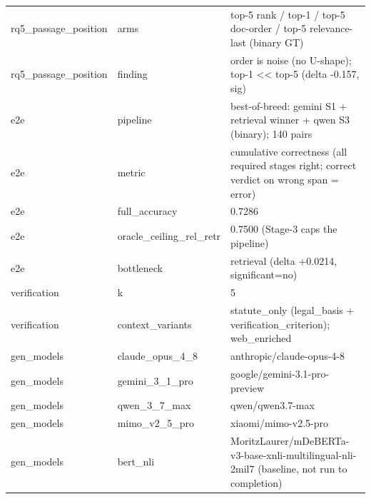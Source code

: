 \begin{table}[htbp]
\begin{tabular}{lll}
    rq5\_passage\_position & arms & top-5 rank / top-1 / top-5 doc-order / top-5 relevance-last (binary GT) \\
    rq5\_passage\_position & finding & order is noise (no U-shape); top-1 << top-5 (delta -0.157, sig) \\
    e2e & pipeline & best-of-breed: gemini S1 + retrieval winner + qwen S3 (binary); 140 pairs \\
    e2e & metric & cumulative correctness (all required stages right; correct verdict on wrong span = error) \\
    e2e & full\_accuracy & 0.7286 \\
    e2e & oracle\_ceiling\_rel\_retr & 0.7500 (Stage-3 caps the pipeline) \\
    e2e & bottleneck & retrieval (delta +0.0214, significant=no) \\
    verification & k & 5 \\
    verification & context\_variants & statute\_only (legal\_basis + verification\_criterion); web\_enriched \\
    gen\_models & claude\_opus\_4\_8 & anthropic/claude-opus-4-8 \\
    gen\_models & gemini\_3\_1\_pro & google/gemini-3.1-pro-preview \\
    gen\_models & qwen\_3\_7\_max & qwen/qwen3.7-max \\
    gen\_models & mimo\_v2\_5\_pro & xiaomi/mimo-v2.5-pro \\
    gen\_models & bert\_nli & MoritzLaurer/mDeBERTa-v3-base-xnli-multilingual-nli-2mil7 (baseline, not run to completion) \\
    \bottomrule
  \end{tabular}
\end{table}
